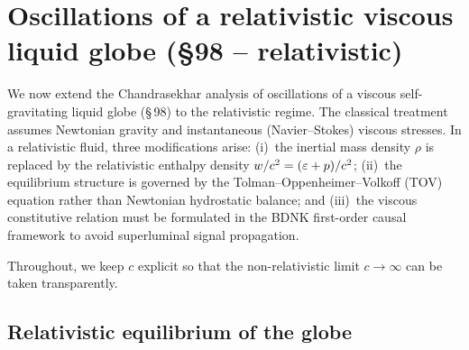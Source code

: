 %
%
%

\section{Oscillations of a relativistic viscous liquid globe (\S98 -- relativistic)}\label{sec:rel-10-98}

We now extend the Chandrasekhar analysis of oscillations of a viscous
self-gravitating liquid globe (\S\,98) to the relativistic regime.
The classical treatment assumes Newtonian gravity and instantaneous
(Navier--Stokes) viscous stresses.  In a relativistic fluid, three
modifications arise: (i)~the inertial mass density $\rho$ is replaced
by the relativistic enthalpy density $w/c^{2} = (\varepsilon + p)/c^{2}$;
(ii)~the equilibrium structure is governed by the
Tolman--Oppenheimer--Volkoff (TOV) equation rather than Newtonian
hydrostatic balance; and (iii)~the viscous constitutive relation
must be formulated in the BDNK first-order causal framework
\citep{BemficaDN2018,Kovtun2019} to avoid superluminal signal
propagation.

Throughout, we keep $c$ explicit so that the non-relativistic limit
$c \to \infty$ can be taken transparently.

\subsection{Relativistic equilibrium of the globe}\label{sec:rel-10-98-equil}

